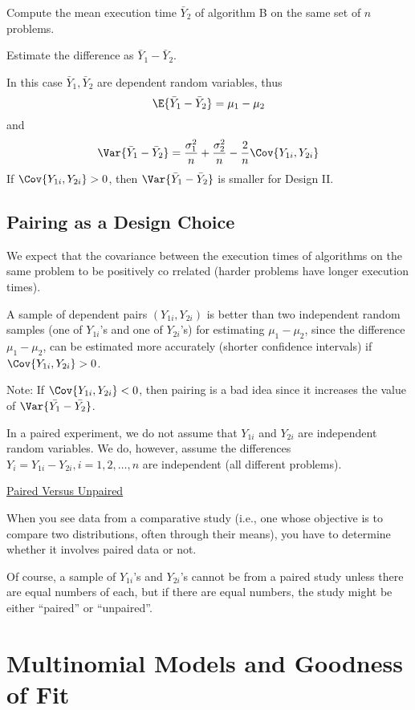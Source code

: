 Compute the mean execution time $\bar{Y}_{2}$ of algorithm B on the same set of $n$ problems.

Estimate the difference as $\bar{Y}_{1}-\bar{Y}_{2}$.

In this case $\bar{Y}_{1}, \bar{Y}_{2}$ are dependent random variables, thus
\[\E{\bar{Y}_{1}-\bar{Y}_{2}}=\mu_{1}-\mu_{2}\]
and
\[\Var{\bar{Y}_{1}-\bar{Y}_{2}}
    =\frac{\sigma_{1}^{2}}{n}+
    \frac{\sigma_{2}^{2}}{n}-\frac{2}{n}
    \Cov{Y_{1 i}, Y_{2 i}}
\]
If $ \Cov{Y_{1 i}, Y_{2 i}}>0$,
then $ \Var{\bar{Y}_{1}-\bar{Y}_{2}}$ is smaller for Design II\@.

\subsection{Pairing as a Design Choice}

We expect that the covariance between the execution times of algorithms on the same problem to be
positively co rrelated (harder problems have longer execution times).

A sample of dependent pairs $\left(Y_{1 i}, Y_{2 i}\right)$ is better than two
independent random samples (one of $Y_{1 i}$'s and one of $Y_{2 i}$'s) for
estimating $\mu_{1}-\mu_{2}$, since the difference $\mu_{1}-\mu_{2}$,
can be estimated more accurately (shorter confidence intervals)
if $\Cov{Y_{1 i}, Y_{2 i}}>0$.

Note: If $\Cov{Y_{1 i}, Y_{2 i}}<0$,
then pairing is a bad idea since it increases the value of
$\Var{\bar{Y_{1}}-\bar{Y_{2}}}$.

In a paired experiment, we do not
assume that $Y_{1 i}$ and $Y_{2 i}$ are independent random variables.
We do, however, assume the differences $Y_{i}=Y_{1 i}-Y_{2 i}, i=1,2, \ldots, n$
are independent (all different problems).

\underline{Paired Versus Unpaired}

When you see data from a comparative study (i.e., one
whose objective is to compare two distributions, often through their means),
you have to determine whether it involves paired data or not.

Of course, a sample of $Y_{1 i}$'s and $Y_{2 i}$'s cannot be
from a paired study unless there are equal numbers of each, but
if there are equal numbers, the study might be either ``paired'' or
``unpaired''.

\section{Multinomial Models and Goodness of Fit}
